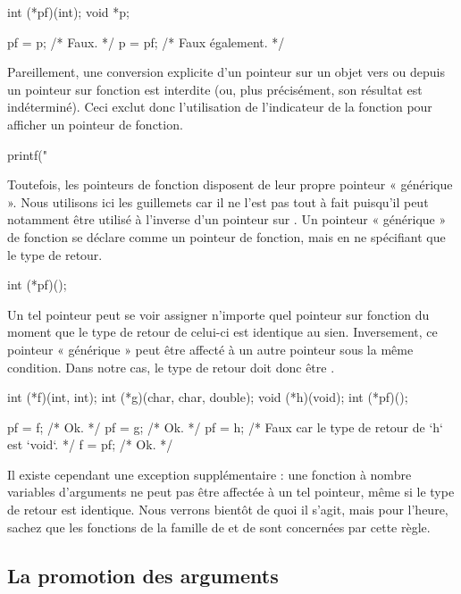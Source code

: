 \begin{C}
int (*pf)(int);
void *p;

pf = p; /* Faux. */
p = pf; /* Faux également. */
\end{C}

Pareillement, une conversion explicite d'un pointeur sur un objet vers
ou depuis un pointeur sur fonction est interdite (ou, plus précisément,
son résultat est indéterminé). Ceci exclut donc l'utilisation de
l'indicateur  de la fonction  pour afficher
un pointeur de fonction.

\begin{C}
printf("%
\end{C}

Toutefois, les pointeurs de fonction disposent de leur propre pointeur «
générique ». Nous utilisons ici les guillemets car il ne l'est pas tout
à fait puisqu'il peut notamment être utilisé à l'inverse d'un pointeur
sur . Un pointeur « générique » de fonction se déclare
comme un pointeur de fonction, mais en ne spécifiant que le type de
retour.

\begin{C}
int (*pf)();
\end{C}

Un tel pointeur peut se voir assigner n'importe quel pointeur sur
fonction du moment que le type de retour de celui-ci est identique au
sien. Inversement, ce pointeur « générique » peut être affecté à un
autre pointeur sous la même condition. Dans notre cas, le type de retour
doit donc être .

\begin{C}
int (*f)(int, int);
int (*g)(char, char, double);
void (*h)(void);
int (*pf)();

pf = f; /* Ok. */
pf = g; /* Ok. */
pf = h; /* Faux car le type de retour de `h` est `void`. */
f = pf; /* Ok. */
\end{C}

\begin{attentionbox}
  Il existe cependant une exception
supplémentaire : une fonction à nombre variables d'arguments ne peut pas
être affectée à un tel pointeur, même si le type de retour est
identique. Nous verrons bientôt de quoi il s'agit, mais pour l'heure,
sachez que les fonctions de la famille de  et de
 sont concernées par cette règle.
\end{attentionbox}


\subsection{La promotion des arguments}
\label{la-promotion-des-arguments}

